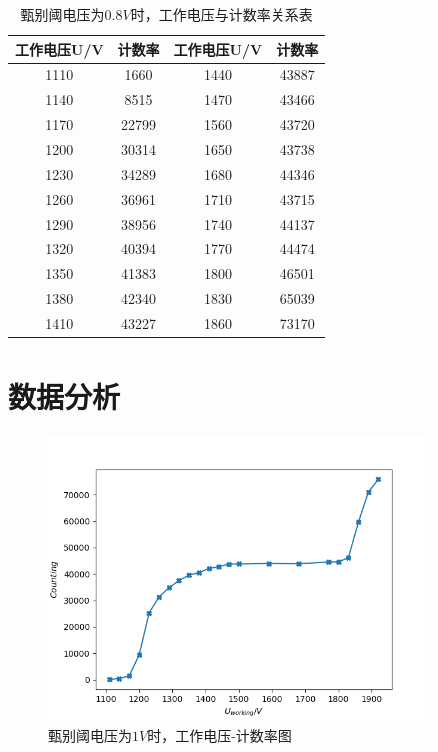 \documentclass[a4paper,UTF8]{ctexart}
\begin{document}
\begin{table}[!ht]
    \centering
    \caption{甄别阈电压为$0.8V$时，工作电压与计数率关系表}
    \begin{tabular}{|c|c|c|c|}
    \hline
        \textbf{工作电压U/V} & \textbf{计数率} & \textbf{工作电压U/V} & \textbf{计数率} \\ \hline
        1110 & 1660 & 1440 & 43887 \\ \hline
        1140 & 8515 & 1470 & 43466 \\ \hline
        1170 & 22799 & 1560 & 43720 \\ \hline
        1200 & 30314 & 1650 & 43738 \\ \hline
        1230 & 34289 & 1680 & 44346 \\ \hline
        1260 & 36961 & 1710 & 43715 \\ \hline
        1290 & 38956 & 1740 & 44137 \\ \hline
        1320 & 40394 & 1770 & 44474 \\ \hline
        1350 & 41383 & 1800 & 46501 \\ \hline
        1380 & 42340 & 1830 & 65039 \\ \hline
        1410 & 43227 & 1860 & 73170 \\ \hline
    \end{tabular}
\end{table}

\section{数据分析}

\begin{figure}[H]
    \centering
    \begin{minipage}[b]{0.9\textwidth}
        \centering
        \includegraphics[width=0.9\textwidth]{./ffig1.png}
        \caption{甄别阈电压为$1V$时，工作电压-计数率图}
    \end{minipage}
\end{figure}
\end{document}
